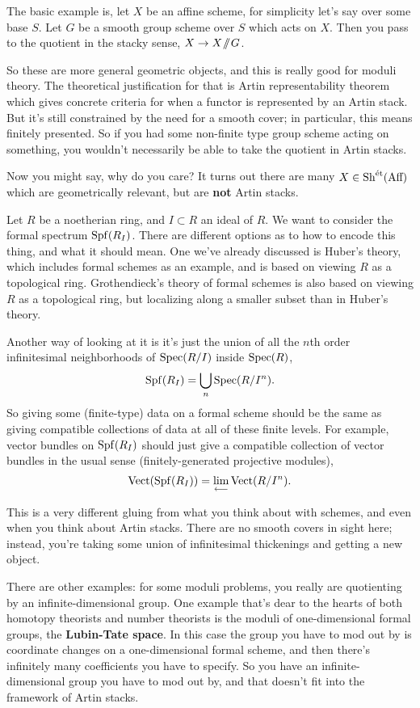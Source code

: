 The basic example is, let $X$ be an affine scheme, for simplicity let's say over some base $S$. Let $G$ be a smooth group scheme over $S$ which acts on $X$. Then you pass to the quotient in the stacky sense, $X \to X\mathbin{\!/\!\!/\!} G$.

So these are more general geometric objects, and this is really good for moduli theory. The theoretical justification for that is Artin representability theorem which gives concrete criteria for when a functor is represented by an Artin stack. But it's still constrained by the need for a smooth cover; in particular, this means finitely presented. So if you had some non-finite type group scheme acting on something, you wouldn't necessarily be able to take the quotient in Artin stacks.

Now you might say, why do you care? It turns out there are many $X\in\operatorname{Sh}^{\text{\'et}}(\text{Aff})$ which are geometrically relevant, but are \textbf{not} Artin stacks.

\begin{example}
  \label{ex:15-formal-schemes}
  Let $R$ be a noetherian ring, and $I\subset R$ an ideal of $R$. We want to consider the formal spectrum $\operatorname{Spf}(R_I)$. There are different options as to how to encode this thing, and what it should mean. One we've already discussed is Huber's theory, which includes formal schemes as an example, and is based on viewing $R$ as a topological ring. Grothendieck's theory of formal schemes is also based on viewing $R$ as a topological ring, but localizing along a smaller subset than in Huber's theory.
  
  Another way of looking at it is it's just the union of all the $n$th order infinitesimal neighborhoods of $\operatorname{Spec}(R/I)$ inside $\operatorname{Spec}(R)$,
  \[ \operatorname{Spf}(R_I) = \bigcup_n \operatorname{Spec}(R/I^n). \]
  So giving some (finite-type) data on a formal scheme should be the same as giving compatible collections of data at all of these finite levels. For example, vector bundles on $\operatorname{Spf}(R_I)$ should just give a compatible collection of vector bundles in the usual sense (finitely-generated projective modules),
  \[ \text{Vect}(\operatorname{Spf}(R_I)) = \mathop{\operatorname*{lim}\limits_{\longleftarrow}}\limits \text{Vect}(R/I^n). \]
\end{example}

This is a very different gluing from what you think about with schemes, and even when you think about Artin stacks. There are no smooth covers in sight here; instead, you're taking some union of infinitesimal thickenings and getting a new object.

There are other examples: for some moduli problems, you really are quotienting by an infinite-dimensional group. One example that's dear to the hearts of both homotopy theorists and number theorists is the moduli of one-dimensional formal groups, the \textbf{Lubin-Tate space}. In this case the group you have to mod out by is coordinate changes on a one-dimensional formal scheme, and then there's infinitely many coefficients you have to specify. So you have an infinite-dimensional group you have to mod out by, and that doesn't fit into the framework of Artin stacks. 

